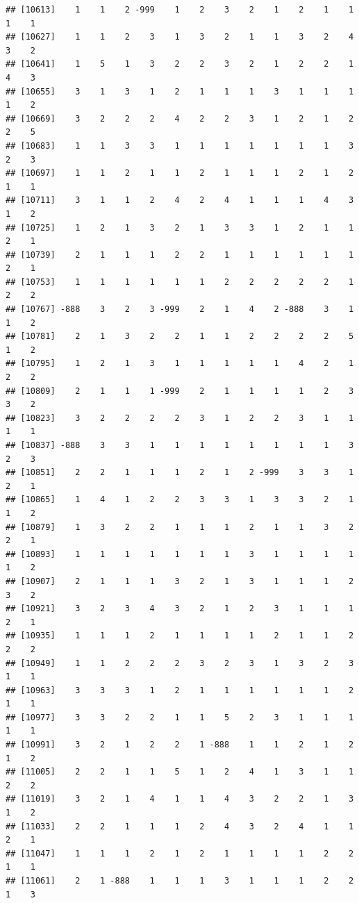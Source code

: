 \documentclass[
  12pt,
  openany]{book}
\begin{document}
\begin{verbatim}
## [10613]    1    1    2 -999    1    2    3    2    1    2    1    1    1    1
## [10627]    1    1    2    3    1    3    2    1    1    3    2    4    3    2
## [10641]    1    5    1    3    2    2    3    2    1    2    2    1    4    3
## [10655]    3    1    3    1    2    1    1    1    3    1    1    1    1    2
## [10669]    3    2    2    2    4    2    2    3    1    2    1    2    2    5
## [10683]    1    1    3    3    1    1    1    1    1    1    1    3    2    3
## [10697]    1    1    2    1    1    2    1    1    1    2    1    2    1    1
## [10711]    3    1    1    2    4    2    4    1    1    1    4    3    1    2
## [10725]    1    2    1    3    2    1    3    3    1    2    1    1    2    1
## [10739]    2    1    1    1    2    2    1    1    1    1    1    1    2    1
## [10753]    1    1    1    1    1    1    2    2    2    2    2    1    2    2
## [10767] -888    3    2    3 -999    2    1    4    2 -888    3    1    1    2
## [10781]    2    1    3    2    2    1    1    2    2    2    2    5    1    2
## [10795]    1    2    1    3    1    1    1    1    1    4    2    1    2    2
## [10809]    2    1    1    1 -999    2    1    1    1    1    2    3    3    2
## [10823]    3    2    2    2    2    3    1    2    2    3    1    1    1    1
## [10837] -888    3    3    1    1    1    1    1    1    1    1    3    2    3
## [10851]    2    2    1    1    1    2    1    2 -999    3    3    1    2    1
## [10865]    1    4    1    2    2    3    3    1    3    3    2    1    1    2
## [10879]    1    3    2    2    1    1    1    2    1    1    3    2    2    1
## [10893]    1    1    1    1    1    1    1    3    1    1    1    1    1    2
## [10907]    2    1    1    1    3    2    1    3    1    1    1    2    3    2
## [10921]    3    2    3    4    3    2    1    2    3    1    1    1    2    1
## [10935]    1    1    1    2    1    1    1    1    2    1    1    2    2    2
## [10949]    1    1    2    2    2    3    2    3    1    3    2    3    1    1
## [10963]    3    3    3    1    2    1    1    1    1    1    1    2    1    1
## [10977]    3    3    2    2    1    1    5    2    3    1    1    1    1    1
## [10991]    3    2    1    2    2    1 -888    1    1    2    1    2    1    2
## [11005]    2    2    1    1    5    1    2    4    1    3    1    1    2    2
## [11019]    3    2    1    4    1    1    4    3    2    2    1    3    1    2
## [11033]    2    2    1    1    1    2    4    3    2    4    1    1    2    1
## [11047]    1    1    1    2    1    2    1    1    1    1    2    2    1    1
## [11061]    2    1 -888    1    1    1    3    1    1    1    2    2    1    3

\end{verbatim}
\end{document}
